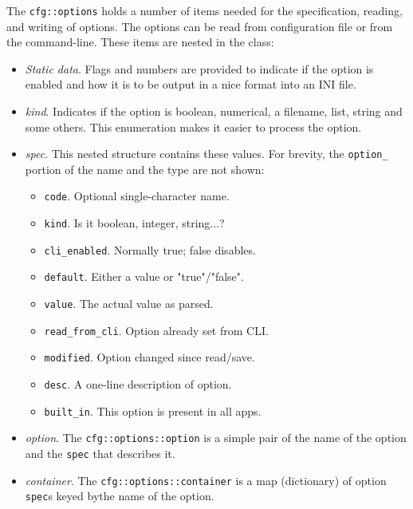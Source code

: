    The \texttt{cfg::options} holds a number of items needed for the
   specification, reading, and writing of options.
   The options can be read from configuration file or from the command-line.
   These items are nested in the class:

   \begin{itemize}
      \item \textsl{Static data}.
         Flags and numbers are provided to indicate if the option is enabled
         and how it is to be output in a nice format into an INI file.
      \item \textsl{kind}.
         Indicates if the option is boolean, numerical, a filename, list,
         string and some others. This enumeration makes it easier to
         process the option.
      \item \textsl{spec}.
         This nested structure contains these values. For brevity, the
         \texttt{option\_} portion of the name and the type are not shown:
         \begin{itemize}
            \item \texttt{code}.
               Optional single-character name.
            \item \texttt{kind}.
               Is it boolean, integer, string...?
            \item \texttt{cli\_enabled}.
               Normally true; false disables.
            \item \texttt{default}.
               Either a value or "true"/"false".
            \item \texttt{value}.
               The actual value as parsed.
            \item \texttt{read\_from\_cli}.
               Option already set from CLI.
            \item \texttt{modified}.
               Option changed since read/save.
            \item \texttt{desc}.
               A one-line description of option.
            \item \texttt{built\_in}.
               This option is present in all apps.
         \end{itemize}
      \item \textsl{option}.
         The \texttt{cfg::options::option} is a simple pair of the
         name of the option and the \texttt{spec} that describes it.
      \item \textsl{container}.
         The \texttt{cfg::options::container} is a map (dictionary) of
         option \texttt{spec}s keyed bythe name of the option.
   \end{itemize}

